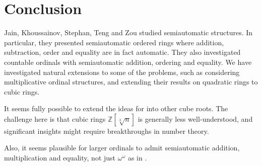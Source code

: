 \documentclass[british,a4paper,11pt,abstract=on]{scrreprt}
\theoremstyle{definition}
\theoremstyle{remark}
\newcommand{\Z}{\mathbb{Z}}
\newcommand{\cbrt}[1]{\sqrt[3]{#1}}
\begin{document}

\chapter{Conclusion}

Jain, Khoussainov, Stephan, Teng and Zou \autocite{semiauto} studied semiautomatic structures.
In particular, they presented semiautomatic ordered rings where addition, subtraction, order and equality are in fact automatic.
They also investigated countable ordinals with semiautomatic addition, ordering and equality.
We have investigated natural extensions to some of the problems, such as considering multiplicative ordinal structures,
and extending their results on quadratic rings to cubic rings.

It seems fully possible to extend the ideas for  into other cube roots.
The challenge here is that cubic rings \(\Z[\cbrt{n}]\) is generally less well-understood,
and significant insights might require breakthroughs in number theory.

Also, it seems plausible for larger ordinals to admit semiautomatic addition, multiplication and equality, not just \(\omega^\omega\) as in .


\printbibliography
\end{document}

